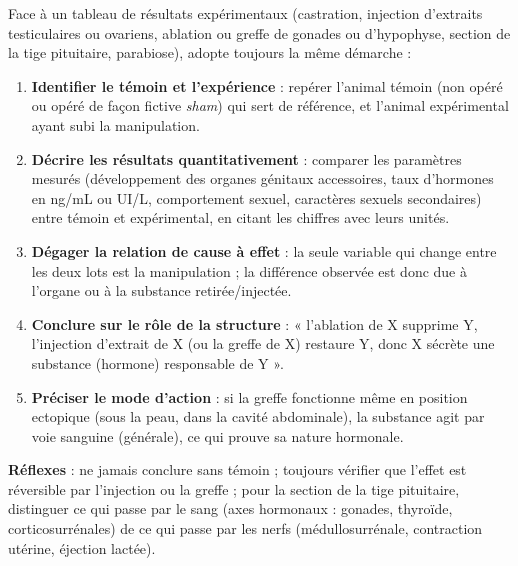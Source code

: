 \documentclass[11pt]{article}
\newcommand{\cle}[1]{{\popxbold\color{popdark}#1}}
\begin{document}
\begin{methode}
Face à un tableau de résultats expérimentaux (castration, injection d'extraits testiculaires ou ovariens, ablation ou greffe de gonades ou d'hypophyse, section de la tige pituitaire, parabiose), adopte toujours la même démarche :
\begin{enumerate}
\item \textbf{Identifier le témoin et l'expérience} : repérer l'animal témoin (non opéré ou opéré de façon fictive \emph{sham}) qui sert de référence, et l'animal expérimental ayant subi la manipulation.
\item \textbf{Décrire les résultats quantitativement} : comparer les paramètres mesurés (développement des organes génitaux accessoires, taux d'hormones en ng/mL ou UI/L, comportement sexuel, caractères sexuels secondaires) entre témoin et expérimental, en citant les chiffres avec leurs unités.
\item \textbf{Dégager la relation de cause à effet} : la seule variable qui change entre les deux lots est la manipulation ; la différence observée est donc due à l'organe ou à la substance retirée/injectée.
\item \textbf{Conclure sur le rôle de la structure} : « l'ablation de X supprime Y, l'injection d'extrait de X (ou la greffe de X) restaure Y, donc X sécrète une substance (hormone) responsable de Y ».
\item \textbf{Préciser le mode d'action} : si la greffe fonctionne même en position ectopique (sous la peau, dans la cavité abdominale), la substance agit par voie \cle{sanguine} (générale), ce qui prouve sa nature \cle{hormonale}.
\end{enumerate}
\textbf{Réflexes} : ne jamais conclure sans témoin ; toujours vérifier que l'effet est réversible par l'injection ou la greffe ; pour la section de la tige pituitaire, distinguer ce qui passe par le sang (axes hormonaux : gonades, thyroïde, corticosurrénales) de ce qui passe par les nerfs (médullosurrénale, contraction utérine, éjection lactée).
\end{methode}
\end{document}
